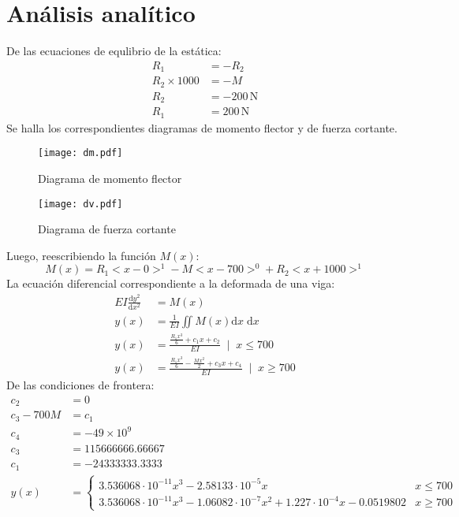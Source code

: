 \documentclass[11pt,a4paper]{article}
\newcommand{\mrm}{\mathrm}
\begin{document}
\section{Análisis analítico}
De las ecuaciones de equlibrio de la estática:
\begin{align*}
    R_{1} &= -R_{2}\\
    R_{2}\times 1000 &= -M\\
    R_{2} &= -200\,\mrm{N}\\
    R_{1} &= 200\,\mrm{N}
\end{align*}
Se halla los correspondientes diagramas de momento flector y de fuerza cortante.
\begin{figure}[H]
    \centering
    \texttt{[image: dm.pdf]}
    \caption{Diagrama de momento flector}
\end{figure}
\begin{figure}[H]
    \centering
    \texttt{[image: dv.pdf]}
    \caption{Diagrama de fuerza cortante}
\end{figure}
Luego, reescribiendo la función $M(x)$:
\begin{equation}
M(x) = R_{1}<x-0>^{1} - M <x-700>^{0} + R_{2} <x+1000>^{1}
\end{equation}
La ecuación diferencial correspondiente a la deformada de una viga:
\begin{align}
    EI\frac{\mrm{d}y^{2}}{\mrm{d}x^{2}} &= M(x)\\
    y(x) &= \frac{1}{EI}\iint M(x) \mrm{d}x \;\mrm{d}x\\
    y(x) &= \frac{\frac{R_{1}x^{3}}{6} + c_{1}x + c_{2}}{EI} \;\;\vert \;\; x \leq 700\\
    y(x) &= \frac{\frac{R_{1}x^{3}}{6} - \frac{Mx^{2}}{2} + c_{3}x + c_{4}}{EI} \;\;\vert \;\;x \geq 700
\end{align}
De las condiciones de frontera:
\begin{align}
    c_{2} &= 0\\
    c_{3} - 700M &= c_{1}\\
    c_{4} &= -49\times 10^{9}\\
    c_{3} &= 115666666.66667\\
    c_{1} &= -24333333.3333 \\
    y(x) &= \begin{cases}
    3.536068\cdot 10^{-11} x^{3} - 2.58133 \cdot 10^{-5}x & x \leq 700\\
    3.536068\cdot 10^{-11} x^{3} - 1.06082 \cdot 10^{-7} x^{2} + 1.227 \cdot 10^{-4}x - 0.0519802 & x \geq 700
    \end{cases}
\end{align}
\end{document}

